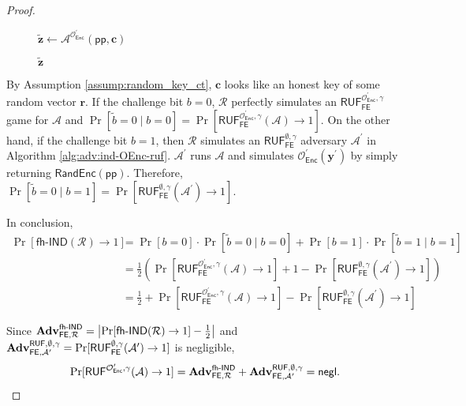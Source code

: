 \begin{proof}
\begin{figure}[h]
\begin{minipage}{0.4\linewidth}
\begin{algorithm}[H]
\begin{algorithmic}[1]
		\State ${\mathbf{\tilde{z}}} \gets {\mathcal{A}}^{\mathcal{O}^\prime_{\textsf{Enc}}} (\textsf{pp}, \mathbf{c})$

		\State \Return $\mathbf{\tilde{z}}$
	\end{algorithmic}
	\end{algorithm}
	\end{minipage}
	
\end{figure}

By Assumption \ref{assump:random_key_ct}, $\mathbf{c}$ looks like an honest key of some random vector $\mathbf{r}$. If the challenge bit $b = 0$, $\mathcal{R}$ perfectly simulates an $\textsf{RUF}^{\mathcal{O}^\prime_{\textsf{Enc}}, \gamma}_{\textsf{FE}}$ game for $\mathcal{A}$ and $\Pr[\tilde{b} = 0 \mid b = 0] = \Pr[ \textsf{RUF}^{\mathcal{O}^\prime_{\textsf{Enc}}, \gamma}_{\textsf{FE}}(\mathcal{A}) \to 1 ]$. On the other hand, if the challenge bit $b = 1$, then $\mathcal{R}$ simulates an $\textsf{RUF}^{\emptyset, \gamma}_{\textsf{FE}}$ adversary $\mathcal{A}^\prime$ in Algorithm \ref{alg:adv:ind-OEnc-ruf}. $\mathcal{A}^\prime$ runs $\mathcal{A}$ and simulates $\mathcal{O}^\prime_{\textsf{Enc}}(\mathbf{y}^\prime)$ by simply returning $\textsf{RandEnc}(\textsf{pp})$. Therefore, $\Pr[\tilde{b} = 0 \mid b = 1] = \Pr[ \textsf{RUF}^{\emptyset, \gamma}_{\textsf{FE}}(\mathcal{A}^\prime) \to 1 ]$.

In conclusion,
\begin{align*}
	\Pr[\textsf{fh-IND}(\mathcal{R}) \to 1] 
	&= \Pr[b = 0] \cdot \Pr[\tilde{b} = 0 \mid b = 0] + \Pr[b = 1] \cdot \Pr[\tilde{b} = 1 \mid b = 1] \\
	&= \frac{1}{2} \left( \Pr[\textsf{RUF}^{\mathcal{O}^\prime_{\textsf{Enc}}, \gamma}_{\textsf{FE}}(\mathcal{A}) \to 1] + 1 - \Pr[ \textsf{RUF}^{\emptyset, \gamma}_{\textsf{FE}}(\mathcal{A}^\prime) \to 1 ] \right) \\
	&= \frac{1}{2} + \Pr[\textsf{RUF}^{\mathcal{O}^\prime_{\textsf{Enc}}, \gamma}_{\textsf{FE}}(\mathcal{A}) \to 1] - \Pr[ \textsf{RUF}^{\emptyset, \gamma}_{\textsf{FE}}(\mathcal{A}^\prime) \to 1 ]
\end{align*}

Since $\mathbf{Adv}_{\textsf{FE}, \mathcal{R}}^\textsf{fh-IND} = \left| \Pr[\textsf{fh-IND}(\mathcal{R}) \to 1] - \frac{1}{2} \right|$ and $\mathbf{Adv}_{\textsf{FE}, \mathcal{A}^\prime }^{\textsf{RUF}, \emptyset, \gamma} = \Pr[\textsf{RUF}^{\emptyset, \gamma}_{\textsf{FE}}(\mathcal{A}^\prime) \to 1 ]$ is negligible,
\[
	\Pr[ \textsf{RUF}^{\mathcal{O}^\prime_{\textsf{Enc}}, \gamma}(\mathcal{A}) \to 1]  = \mathbf{Adv}_{\textsf{FE}, \mathcal{R}}^\textsf{fh-IND} + \mathbf{Adv}_{\textsf{FE}, \mathcal{A}^\prime }^{\textsf{RUF}, \emptyset, \gamma} = \mathsf{negl}.
\]

\end{proof}


